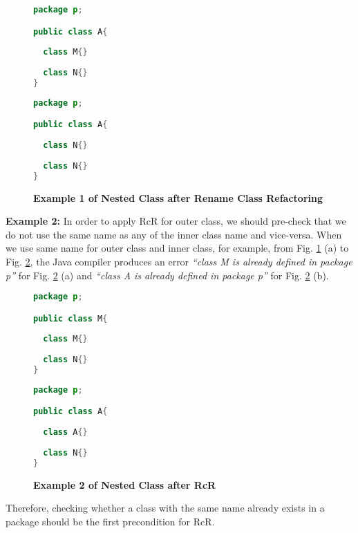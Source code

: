 \begin{figure}[th]
\centering
\begin{minipage}[t]{0.45\linewidth}
\begin{lstlisting}[language=java, basicstyle=\scriptsize\ttfamily,frame=single]
package p;

public class A{	
  
  class M{}
	
  class N{}
} 
\end{lstlisting}
\end{minipage}
\hfill
\begin{minipage}[t]{0.45\linewidth}
\begin{lstlisting}[language=java, basicstyle=\scriptsize\ttfamily,frame=single]
package p;

public class A{	
    
  class N{}
    
  class N{}
} 
\end{lstlisting}
\end{minipage}
\caption{\textbf{Example 1 of Nested Class after Rename Class Refactoring}}
\label{figure:nestedclass1}
\end{figure}


\textbf{Example 2:} In order to apply RcR for outer class, we should pre-check that we do not use the same name as any of the inner class name and vice-versa. 
When we use same name for outer class and inner class, for example, from Fig. \ref{figure:nestedclass1} (a) to Fig. \ref{figure:nestedclass2},  the Java compiler produces an error \textit{``class M is already defined in package p''} for Fig. \ref{figure:nestedclass2} (a) and \textit{``class A is already defined in package p''} for Fig. \ref{figure:nestedclass2} (b).

\begin{figure}[th]
\centering
\begin{minipage}[t]{0.45\linewidth}
\begin{lstlisting}[language=java, basicstyle=\scriptsize\ttfamily,frame=single]
package p;

public class M{	
  
  class M{}
	
  class N{}
} 
\end{lstlisting}
\end{minipage}
\hfill
\begin{minipage}[t]{0.45\linewidth}
\begin{lstlisting}[language=java, basicstyle=\scriptsize\ttfamily,frame=single]
package p;

public class A{	
    
  class A{}
    
  class N{}
} 
\end{lstlisting}
\end{minipage}
\caption{\textbf{Example 2 of Nested Class after RcR}}
\label{figure:nestedclass2}
\end{figure}

Therefore, checking whether a class with the same name already exists in a package should be the first precondition for RcR. 
   
